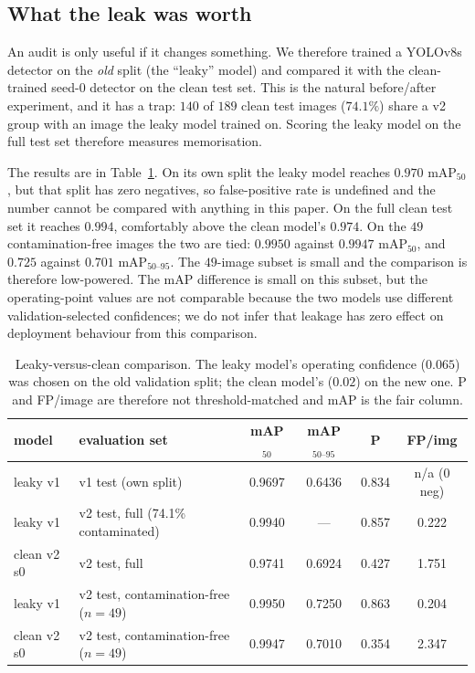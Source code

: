 \subsection{What the leak was worth}
\label{sec:leakvalue}

An audit is only useful if it changes something. We therefore trained a YOLOv8s
detector on the \emph{old} split (the ``leaky'' model) and compared it with the
clean-trained seed-0 detector on the clean test set. This is the natural
before/after experiment, and it has a trap: $140$ of $189$ clean test images
($74.1\%$) share a v2 group with an image the leaky model trained on. Scoring the
leaky model on the full test set therefore measures memorisation.

The results are in Table~\ref{tab:leaky}. On its own split the leaky model
reaches $0.970$ mAP$_{50}$, but that split has zero negatives, so false-positive
rate is undefined and the number cannot be compared with anything in this paper.
On the full clean test set it reaches $0.994$, comfortably above the clean
model's $0.974$. On the $49$ contamination-free images the two are tied:
$0.9950$ against $0.9947$ mAP$_{50}$, and $0.725$ against $0.701$ mAP$_{50\text{--}95}$.
The $49$-image subset is small and the comparison is therefore low-powered. The
mAP difference is small on this subset, but the operating-point values are not
comparable because the two models use different validation-selected confidences;
we do not infer that leakage has zero effect on deployment behaviour from this
comparison.

\begin{table}[t]
\centering
\small
\caption{Leaky-versus-clean comparison. The leaky model's operating confidence
($0.065$) was chosen on the old validation split; the clean model's ($0.02$) on
the new one. P and FP/image are therefore not threshold-matched and mAP is the
fair column.}
\label{tab:leaky}
\begin{tabular}{llcccc}
\toprule
model & evaluation set & mAP$_{50}$ & mAP$_{50\text{--}95}$ & P & FP/img \\
\midrule
leaky v1 & v1 test (own split) & 0.9697 & 0.6436 & 0.834 & n/a (0 neg) \\
leaky v1 & v2 test, full (74.1\% contaminated) & 0.9940 & --- & 0.857 & 0.222 \\
clean v2 s0 & v2 test, full & 0.9741 & 0.6924 & 0.427 & 1.751 \\
\midrule
leaky v1 & v2 test, contamination-free ($n=49$) & 0.9950 & 0.7250 & 0.863 & 0.204 \\
clean v2 s0 & v2 test, contamination-free ($n=49$) & 0.9947 & 0.7010 & 0.354 & 2.347 \\
\bottomrule
\end{tabular}
\end{table}

